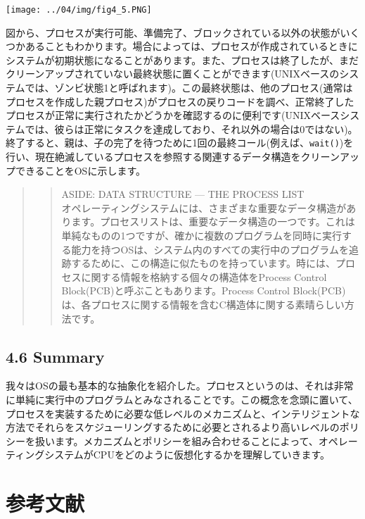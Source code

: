 \texttt{[image: ../04/img/fig4\_5.PNG]}

図から、プロセスが実行可能、準備完了、ブロックされている以外の状態がいくつかあることもわかります。場合によっては、プロセスが作成されているときにシステムが初期状態になることがあります。また、プロセスは終了したが、まだクリーンアップされていない最終状態に置くことができます(UNIXベースのシステムでは、ゾンビ状態1と呼ばれます)。この最終状態は、他のプロセス(通常はプロセスを作成した親プロセス)がプロセスの戻りコードを調べ、正常終了したプロセスが正常に実行されたかどうかを確認するのに便利です(UNIXベースシステムでは、彼らは正常にタスクを達成しており、それ以外の場合は0ではない)。終了すると、親は、子の完了を待つために1回の最終コール(例えば、\texttt{wait()})を行い、現在絶滅しているプロセスを参照する関連するデータ構造をクリーンアップできることをOSに示します。

\begin{quote}
\begin{quote}
ASIDE: DATA STRUCTURE --- THE PROCESS LIST\\
オペレーティングシステムには、さまざまな重要なデータ構造があります。プロセスリストは、重要なデータ構造の一つです。これは単純なものの1つですが、確かに複数のプログラムを同時に実行する能力を持つOSは、システム内のすべての実行中のプログラムを追跡するために、この構造に似たものを持っています。時には、プロセスに関する情報を格納する個々の構造体をProcess
Control Block(PCB)と呼ぶこともあります。Process Control
Block(PCB)は、各プロセスに関する情報を含むC構造体に関する素晴らしい方法です。
\end{quote}
\end{quote}

\hypertarget{summary}{%
\subsection*{4.6 Summary}\label{summary}}

我々はOSの最も基本的な抽象化を紹介した。プロセスというのは、それは非常に単純に実行中のプログラムとみなされることです。この概念を念頭に置いて、プロセスを実装するために必要な低レベルのメカニズムと、インテリジェントな方法でそれらをスケジューリングするために必要とされるより高いレベルのポリシーを扱います。メカニズムとポリシーを組み合わせることによって、オペレーティングシステムがCPUをどのように仮想化するかを理解していきます。

\hypertarget{ux53c2ux8003ux6587ux732e}{%
\section*{参考文献}\label{ux53c2ux8003ux6587ux732e}}

